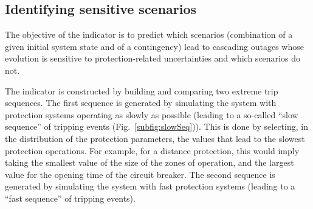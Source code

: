 \subsection{Identifying sensitive scenarios}
\label{sec:protection_indicator}

The objective of the indicator is to predict which scenarios (combination of a given initial system state and of a contingency) lead to cascading outages whose evolution is sensitive to protection-related uncertainties and which scenarios do not.

The indicator is constructed by building and comparing two extreme trip sequences. The first sequence is generated by simulating the system with protection systems operating as slowly as possible (leading to a so-called ``slow sequence'' of tripping events (Fig.~\ref{subfig:slowSeq})). This is done by selecting, in the distribution of the protection parameters, the values that lead to the slowest protection operations. For example, for a distance protection, this would imply taking the smallest value of the size of the zones of operation, and the largest value for the opening time of the circuit breaker. The second sequence is generated by simulating the system with fast protection systems (leading to a ``fast sequence'' of tripping events).%

